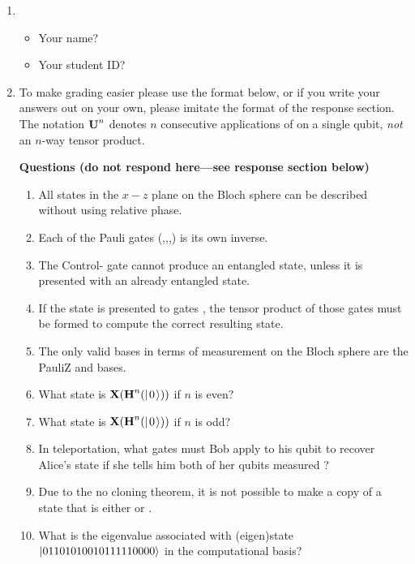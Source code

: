 \documentclass[12pt]{article}
\begin{document}
\begin{enumerate}
    \item{} \begin{itemize}
    \item Your name? \Blank[3in]{}
    \item Your student ID? \Blank[3in]{}
\end{itemize}

\item {} To make grading easier please use the format below, or if you write your answers out on your own, please imitate the format of the response section.  The notation $\mbox{\bfseries{\textrm{U}}}^{n}$ denotes $n$ consecutive applications of  on a single qubit, \emph{not} an $n$-way tensor product.

\textbf{Questions (do not respond here---see response section below)}
\begin{enumerate}[label=\theenumi.\arabic*]
   \item\label{tf:a} All states in the $x-z$ plane on the Bloch sphere can be described without using relative phase.
   \item\label{tf:b} Each of the Pauli gates (\PauliX,\PauliY,\PauliZ,\Hadamard) is its own inverse.
   \item\label{tf:c} The Control-\PauliZ{} gate cannot produce an entangled state, unless it is presented with an already entangled state.
   \item\label{tf:d} If the state  is presented to gates \TensProd{\Hadamard}{\PauliX}, the tensor product of those gates must be formed to compute the correct resulting state.
   \item\label{tf:e} The only valid bases in terms of measurement on the Bloch sphere are the PauliZ{} and \PauliX{} bases.
   \item\label{tf:f} What state is $\PauliX(\Hadamard^{n}(\QZero))$ if $n$ is even?
      \item\label{tf:g} What state is $\PauliX(\Hadamard^{n}(\QZero))$ if $n$ is odd?
    \item\label{tf:h} In teleportation, what gates must Bob apply to his qubit to recover Alice's state if she tells him both of her qubits measured \QOne{}?
    \item\label{tf:i} Due to the no cloning theorem, it is not possible to make a copy of a state that is either \QZero{} or \QOne{}.
    \item\label{tf:j} What is the eigenvalue associated with (eigen)state $\ket{01101010010111110000}$ in the computational basis?
\end{enumerate}


\end{enumerate}
\end{document}
